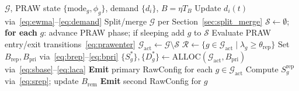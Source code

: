 \documentclass[journal]{IEEEtran}
\begin{document}
\begin{algorithm}[!t]
\caption{TRAW: per-beacon AP adaptation}
\label{alg:traw}
\begin{algorithmic}[1]
\Require $\mathcal{G}$, PRAW state $\{\mathrm{mode}_g,\phi_g\}$,
  demand $\{d_i\}$, $B\!=\!\eta T_B$
\State Update $d_i(t)$ via~\eqref{eq:ewma}--\eqref{eq:demand}
\State Split/merge $\mathcal{G}$ per Section~\ref{sec:split_merge}
\State $\mathcal{S}\!\leftarrow\!\emptyset$;
  \textbf{for each} $g$: advance PRAW phase;
  if sleeping add $g$ to $\mathcal{S}$
\State Evaluate PRAW entry/exit transitions~\eqref{eq:prawenter}
\State $\mathcal{G}_\mathrm{act}\!\leftarrow\!\mathcal{G}\setminus\mathcal{S}$
\State $\mathcal{R}\!\leftarrow\!\{g\!\in\!\mathcal{G}_\mathrm{act}
  \mid\lambda_g\!\geq\!\theta_\mathrm{rep}\}$
\State Set $B_\mathrm{rep},B_\mathrm{pri}$ via~\eqref{eq:brep}--\eqref{eq:bpri}
\State $\{S_g^*\},\{D_g^*\}\!\leftarrow\!\mathrm{ALLOC}(\mathcal{G}_\mathrm{act},
  B_\mathrm{pri})$ via~\eqref{eq:sbase}--\eqref{eq:laca}
\State \textbf{Emit} primary RawConfig for each $g\!\in\!\mathcal{G}_\mathrm{act}$
  \State Compute $S_g^\mathrm{rep}$ via~\eqref{eq:srep}; update $B_\mathrm{rem}$
  \State \textbf{Emit} second RawConfig for $g$
\EndFor
\end{algorithmic}
\end{algorithm}
\end{document}
